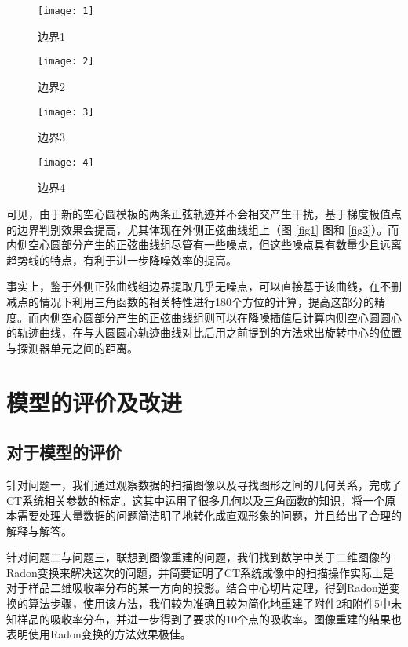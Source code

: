 \documentclass[withoutpreface,bwprint]{cumcmthesis} %
\begin{document}
    \begin{figure}[!htbp]
      \begin{minipage}[t]{1.5in}
        \centering
        \texttt{[image: 1]}
        \caption{边界1}
        \label{fig1}
      \end{minipage}
      \begin{minipage}[t]{1.5in}
        \centering
        \texttt{[image: 2]}
        \caption{边界2}
        \label{fig2}
      \end{minipage}
      \begin{minipage}[t]{1.5in}
        \centering
        \texttt{[image: 3]}
        \caption{边界3}
        \label{fig3}
      \end{minipage}
      \begin{minipage}[t]{1.5in}
        \centering
        \texttt{[image: 4]}
        \caption{边界4}
        \label{fig4}
      \end{minipage}
    \end{figure}

    可见，由于新的空心圆模板的两条正弦轨迹并不会相交产生干扰，基于梯度极值点的边界判别效果会提高，尤其体现在外侧正弦曲线组上（图 \ref{fig1} 图和 \ref{fig3}）。而内侧空心圆部分产生的正弦曲线组尽管有一些噪点，但这些噪点具有数量少且远离趋势线的特点，有利于进一步降噪效率的提高。

    事实上，鉴于外侧正弦曲线组边界提取几乎无噪点，可以直接基于该曲线，在不删减点的情况下利用三角函数的相关特性进行180个方位的计算，提高这部分的精度。而内侧空心圆部分产生的正弦曲线组则可以在降噪插值后计算内侧空心圆圆心的轨迹曲线，在与大圆圆心轨迹曲线对比后用之前提到的方法求出旋转中心的位置与探测器单元之间的距离。


\section{模型的评价及改进}

  \subsection{对于模型的评价}

    针对问题一，我们通过观察数据的扫描图像以及寻找图形之间的几何关系，完成了CT系统相关参数的标定。这其中运用了很多几何以及三角函数的知识，将一个原本需要处理大量数据的问题简洁明了地转化成直观形象的问题，并且给出了合理的解释与解答。

    针对问题二与问题三，联想到图像重建的问题，我们找到数学中关于二维图像的Radon变换来解决这次的问题，并简要证明了CT系统成像中的扫描操作实际上是对于样品二维吸收率分布的某一方向的投影。结合中心切片定理，得到Radon逆变换的算法步骤，使用该方法，我们较为准确且较为简化地重建了附件2和附件5中未知样品的吸收率分布，并进一步得到了要求的10个点的吸收率。图像重建的结果也表明使用Radon变换的方法效果极佳。
\end{document}
